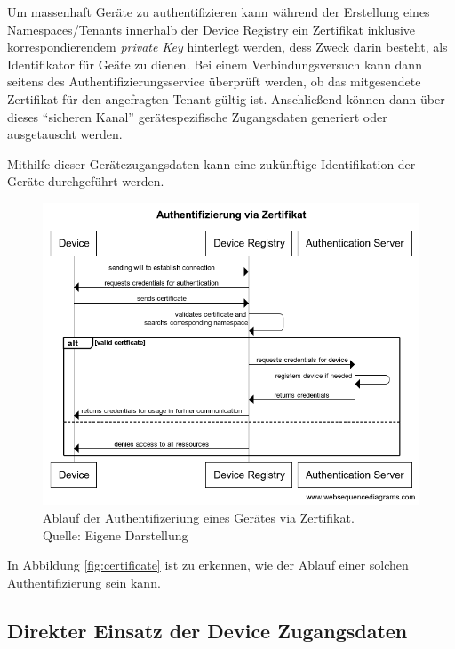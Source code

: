 Um massenhaft Geräte zu authentifizieren kann während der Erstellung eines Namespaces/Tenants innerhalb der Device Registry ein Zertifikat inklusive korrespondierendem \textit{private Key} hinterlegt werden, dess Zweck darin besteht, als Identifikator für Geäte zu dienen. Bei einem Verbindungsversuch kann dann seitens des Authentifizierungsservice überprüft werden, ob das mitgesendete Zertifikat für den angefragten Tenant gültig ist. Anschließend können dann über dieses \enquote{sicheren Kanal} gerätespezifische Zugangsdaten generiert oder ausgetauscht werden.

Mithilfe dieser Gerätezugangsdaten kann eine zukünftige Identifikation der Geräte durchgeführt werden.

\begin{figure}[ht]
    \centering
    \includegraphics[width=1.0\linewidth]{img/device_authentication.png}
    \caption[Ablauf der Authentifizierung via Zertifikat]{Ablauf der Authentifizeriung eines Gerätes via Zertifikat.\\ Quelle: Eigene Darstellung}
    \label{fig:certificate}
\end{figure}

In Abbildung \vref{fig:certificate} ist zu erkennen, wie der Ablauf einer solchen Authentifizierung sein kann.

\subsection{Direkter Einsatz der Device Zugangsdaten}
\label{sec:credentials}

